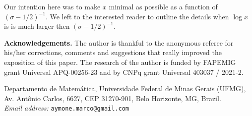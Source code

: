 \documentclass[reqno0,12pt]{amsart}
\theoremstyle{remark}
\begin{document}
Our intention here was to make $x$ minimal as possible as a function of $(\sigma-1/2)^{-1}$. We left to the interested reader to outline the details when $\log x$ is is much larger then $(\sigma-1/2)^{-1}$. 


\vspace{1cm}

\noindent\textbf{Acknowledgements.} The author is thankful to the anonymous referee for his/her corrections, comments and suggestions that really improved the exposition of this paper. The research of the author is funded by FAPEMIG grant Universal APQ-00256-23 and by CNPq grant Universal 403037 / 2021-2.   




\vspace{2cm}

{\small{\sc \noindent
Departamento de Matem\'atica, Universidade Federal de Minas Gerais (UFMG), Av. Ant\^onio Carlos, 6627, CEP 31270-901, Belo Horizonte, MG, Brazil.} \\
\textit{Email address:} \verb|aymone.marco@gmail.com| }
 
\end{document}
